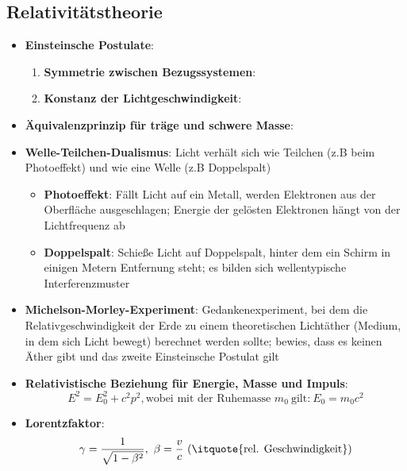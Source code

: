 \newpage
\subsection{Relativitätstheorie}%
\label{mech:sub:relativitaetstheorie}

\begin{itemize}
	\item \textbf{Einsteinsche Postulate}:
	\begin{enumerate}
		\item \textbf{Symmetrie zwischen Bezugssystemen}: 
		\item \textbf{Konstanz der Lichtgeschwindigkeit}: 
	\end{enumerate}
	\item \textbf{Äquivalenzprinzip für träge und schwere Masse}: 
	\item \textbf{Welle-Teilchen-Dualismus}: Licht verhält sich wie Teilchen (z.B beim Photoeffekt) und wie eine Welle (z.B Doppelspalt)
	\begin{itemize}
		\item \textbf{Photoeffekt}: Fällt Licht auf ein Metall, werden Elektronen aus der Oberfläche ausgeschlagen; Energie der gelösten Elektronen hängt von der Lichtfrequenz ab
		\item \textbf{Doppelspalt}: Schieße Licht auf Doppelspalt, hinter dem ein Schirm in einigen Metern Entfernung steht; es bilden sich wellentypische Interferenzmuster
	\end{itemize}
	\item \textbf{Michelson-Morley-Experiment}: Gedankenexperiment, bei dem die Relativgeschwindigkeit der Erde zu einem theoretischen Lichtäther (Medium, in dem sich Licht bewegt) berechnet werden sollte; bewies, dass es keinen Äther gibt und das zweite Einsteinsche Postulat gilt
	\item \textbf{Relativistische Beziehung für Energie, Masse und Impuls}:
	\begin{equation}
		E^2 = E_0^2 + c^2p^2,\text{wobei mit der Ruhemasse } m_0\ \text{gilt:}\ E_0 = m_0c^2
	\end{equation}
	\item \textbf{Lorentzfaktor}:
	\begin{equation}
		\gamma = \frac{1}{\sqrt{1 - \beta^2}},\ \beta = \frac{v}{c}\ (\text{\itquote{rel. Geschwindigkeit}})

\end{equation}
\end{itemize}
